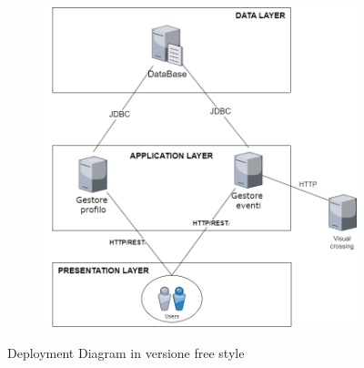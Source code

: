 \begin{figure}[ht!]
    \centering
    \begin{subfigure}{0.9\textwidth}
        \includegraphics[width=\linewidth]{Iterazione 0/immagini/DeployemenFreeStyle.png}
    \end{subfigure}
    \caption{Deployment Diagram in versione free style}
    \label{fig:DeployementFreeStyle}
\end{figure}
